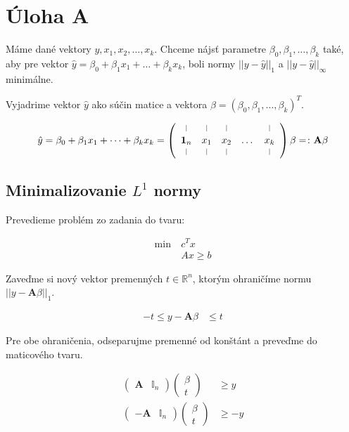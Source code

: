 \documentclass[report.tex]{subfiles}
\begin{document}
\section{Úloha A}

Máme dané vektory $y, x_1, x_2, \dots, x_k$. Chceme nájsť parametre $\beta_0, \beta_1,\dots,\beta_k$ také, aby pre vektor $\hat{y} = \beta_0 + \beta_1x_1 + \dots + \beta_kx_k$, boli normy $||y - \hat{y}||_1$ a $||y - \hat{y}||_{\infty}$ minimálne. 

Vyjadrime vektor $\hat{y}$ ako súčin matice a vektora $\beta = (\beta_0, \beta_1, \dots, \beta_k)^T$.

\begin{align*}
	\hat{y} = \beta_0 + \beta_1x_1 + \dots + \beta_kx_k = 
	\left(
		\begin{array}{ccccc}
			\vertbar & \vertbar & \vertbar &  & \vertbar \\
			\mathbf{1}_n & x_1 & x_2 & \dots & x_k \\
			\vertbar & \vertbar & \vertbar &  & \vertbar
		\end{array}
	\right)
	\beta
	=\colon
	\mathbf{A} \beta
\end{align*}

\subsection{Minimalizovanie $L^1$ normy}

Prevedieme problém zo zadania do tvaru:

\begin{align*}
	\text{min}~ &c^Tx\\
	&Ax \geq b
\end{align*}

Zaveďme si nový vektor premenných $t \in \mathbb{R}^n$, ktorým ohraničíme normu $||y - \mathbf{A} \beta||_1$.

\begin{align*}
	-t \leq y - \mathbf{A} \beta &\leq t
\end{align*}	

Pre obe ohraničenia, odseparujme premenné od konštánt a preveďme do maticového tvaru.

\begin{align*}
	\left(
		\begin{array}{c|c}
			\mathbf{A} & \mathbb{I}_n
		\end{array}
	\right)
	\left(
		\begin{array}{c}
			\beta \\
			\hline
			t
		\end{array}
	\right) &\geq y \\
	\left(
		\begin{array}{c|c}
			-\mathbf{A} & \mathbb{I}_n
		\end{array}
	\right)
	\left(
		\begin{array}{c}
			\beta \\
			\hline
			t
		\end{array}
	\right) &\geq -y
\end{align*}
\end{document}
